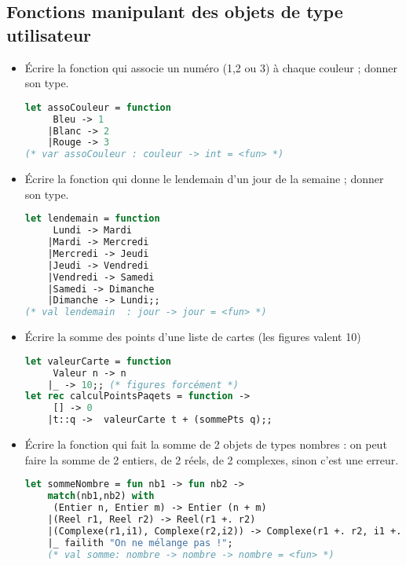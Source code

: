 \subsection{Fonctions manipulant des objets de type utilisateur}
\begin{exemple}
	\begin{itemize}
		\item Écrire la fonction qui associe un numéro (1,2 ou 3) à chaque couleur ; donner son type.
	\begin{lstlisting}[language=Caml, numbers=none, framerule=0pt]
let assoCouleur = function 
	 Bleu -> 1
	|Blanc -> 2
	|Rouge -> 3
(* var assoCouleur : couleur -> int = <fun> *)	
	\end{lstlisting}
\item Écrire la fonction qui donne le lendemain d'un jour de la semaine ; donner son type.
	\begin{lstlisting}[language=Caml, numbers=none, framerule=0pt]
let lendemain = function
	 Lundi -> Mardi
	|Mardi -> Mercredi
	|Mercredi -> Jeudi
	|Jeudi -> Vendredi
	|Vendredi -> Samedi
	|Samedi -> Dimanche
	|Dimanche -> Lundi;;
(* val lendemain  : jour -> jour = <fun> *)	
	\end{lstlisting}
\item Écrire la somme des points d'une liste de cartes (les figures valent 10)
	\begin{lstlisting}[language=Caml, numbers=none, framerule=0pt]
let valeurCarte = function
	 Valeur n -> n 
	|_ -> 10;; (* figures forcément *)
let rec calculPointsPaqets = function ->
	 [] -> 0	
	|t::q ->  valeurCarte t + (sommePts q);;
	\end{lstlisting}
\item Écrire la fonction qui fait la somme de 2 objets de types nombres : on peut faire la somme de 2 entiers, de 2 réels, de 2 complexes, sinon c'est
	une erreur.
	\begin{lstlisting}[language=Caml, numbers=none, framerule=0pt]
let sommeNombre = fun nb1 -> fun nb2 ->
	match(nb1,nb2) with
	 (Entier n, Entier m) -> Entier (n + m)
	|(Reel r1, Reel r2) -> Reel(r1 +. r2)
	|(Complexe(r1,i1), Complexe(r2,i2)) -> Complexe(r1 +. r2, i1 +. i2);;
	|_ failith "On ne mélange pas !";
	(* val somme: nombre -> nombre -> nombre = <fun> *)
	\end{lstlisting}
	\end{itemize}
\end{exemple}

